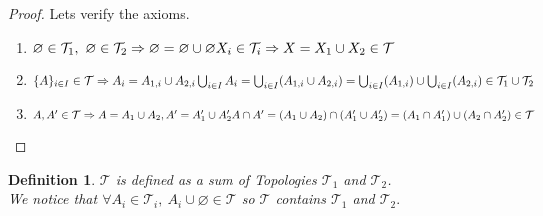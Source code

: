 \documentclass{article}
\newtheorem{definition}{Definition}
\begin{document}
    \begin{proof}
        Lets verify the axioms.
        \begin{enumerate}
            \item $ \varnothing \in \mathcal{T}_1, \ \varnothing \in \mathcal{T}_2 \Rightarrow \varnothing = \varnothing \cup \varnothing \\ X_i \in \mathcal{T}_i \Rightarrow X = X_1 \cup X_2 \in \mathcal{T}$
            \item $\{A\}_{i\in I} \in \mathcal{T} \Rightarrow A_i = A_{1,i} \cup A_{2,i} \\ \bigcup_{i \in I}A_i = \bigcup_{i \in I}(A_{1,i} \cup A_{2,i}) = \bigcup_{i \in I}(A_{1,i}) \cup \bigcup_{i \in I}(A_{2,i}) \in \mathcal{T}_1 \cup \mathcal{T}_2$
            \item $ A, A' \in \mathcal{T} \Rightarrow A = A_1 \cup A_2, A' = A_1' \cup A_2' \\ A \cap A' = (A_1 \cup A_2) \cap (A_1' \cup A_2') = (A_1 \cap A_1') \cup (A_2 \cap A_2') \in \mathcal{T}  $ 
        \end{enumerate}

    \end{proof}
    \begin{definition}
        $\mathcal{T}$ is defined as a sum of Topologies $\mathcal{T}_1$ and $\mathcal{T}_2$. \\ We notice that $\forall A_i \in \mathcal{T}_i, \ A_i \cup \varnothing \in \mathcal{T}$ so $\mathcal{T}$ contains $\mathcal{T}_1$ and $\mathcal{T}_2.$  
    \end{definition}
        
\end{document}
